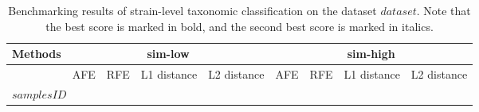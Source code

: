 
\begin{table}[ht]
\renewcommand\arraystretch{1.}
    \centering
    \small
    \setlength\tabcolsep{2pt} 
    \begin{tabular}{p{}|p{1.5cm}<{\centering} p{1.5cm}<{\centering} p{1.5cm}<{\centering} p{1.5cm}<{\centering} | p{1.5cm}<{\centering} p{1.5cm}<{\centering} p{1.5cm}<{\centering} p{}<{\centering} }

    \toprule
    Methods & \multicolumn{4}{c|}{sim-low} & \multicolumn{4}{c}{sim-high}\\
    \hline
    & AFE & RFE & L1 distance & L2 distance & AFE & RFE & L1 distance & L2 distance \\
    \midrule
    \multicolumn{4}{l}{$samplesID$} \\
    \hline     
\bottomrule
    \end{tabular}
    \vspace{1mm}
    \caption{Benchmarking results of strain-level taxonomic classification on the dataset $dataset$. Note that the best score is marked in bold, and the second best score is marked in italics. }
    \label{tab:res_strain_$dataset$}
\end{table}
        